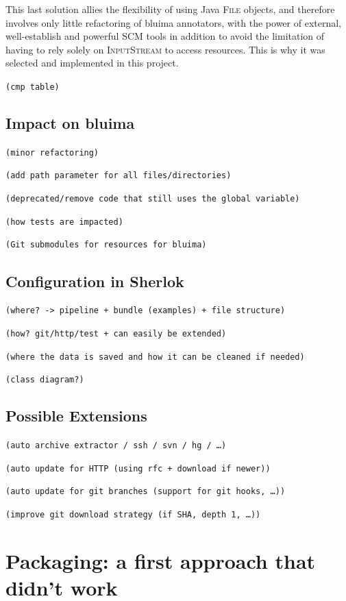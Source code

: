 \documentclass{article}
\newcommand{\ID}[1]{{\textsc{#1}}}
\newcommand{\TODO}[1]{\texttt{\textcolor{YellowOrange}{(#1)}}} %
\begin{document}
This last solution allies the flexibility of using Java \ID{File} objects, and therefore involves
only little refactoring of bluima annotators, with the power of external, well-establish and
powerful SCM tools in addition to avoid the limitation of having to rely solely on \ID{InputStream}
to access resources. This is why it was selected and implemented in this project.

\TODO{cmp table}


\subsection{Impact on bluima}

\TODO{minor refactoring}

\TODO{add path parameter for all files/directories}

\TODO{deprecated/remove code that still uses the global variable}

\TODO{how tests are impacted}

\TODO{Git submodules for resources for bluima}

\subsection{Configuration in Sherlok}

\TODO{where? -> pipeline + bundle (examples) + file structure}

\TODO{how? git/http/test + can easily be extended}

\TODO{where the data is saved and how it can be cleaned if needed}

\TODO{class diagram?}

\subsection{Possible Extensions}

\TODO{auto archive extractor / ssh / svn / hg / \dots}

\TODO{auto update for HTTP (using rfc + download if newer)}

\TODO{auto update for git branches (support for git hooks, \dots)}

\TODO{improve git download strategy (if SHA, depth 1, \dots)}

\section{Packaging: a first approach that didn't work}
\label{sec:packaging1}
\end{document}
